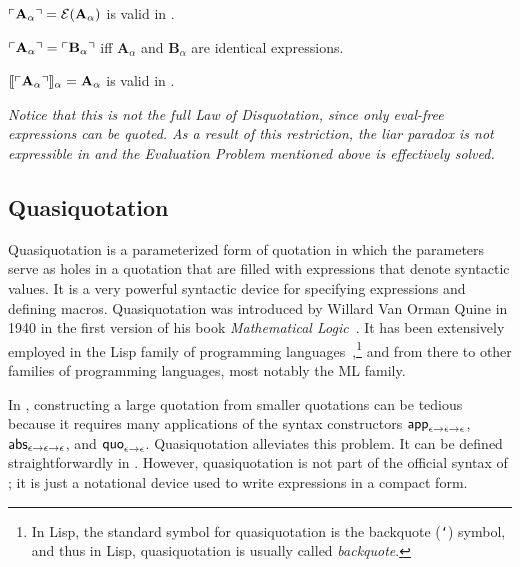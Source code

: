 \documentclass[fleqn]{llncs}
\begin{document}
\begin{thm} \label{thm:sem-quotation}
$\ulcorner\textbf{A}_\alpha\urcorner = \mbox{$\cal E$}(\textbf{A}_\alpha)$ is valid in
  {\churchqe}.
\end{thm}

\begin{cor}$\ulcorner\textbf{A}_\alpha\urcorner = \ulcorner\textbf{B}_\alpha\urcorner$ iff $\textbf{A}_\alpha$ and $\textbf{B}_\alpha$ are identical expressions.
\end{cor}

\begin{thm} \label{thm:sem-disquotation}
$\llbracket\ulcorner\textbf{A}_\alpha\urcorner\rrbracket_\alpha = \textbf{A}_\alpha$
  is valid in {\churchqe}.
\end{thm}

\begin{rem}\em
Notice that this is not the full Law of Disquotation, since only
eval-free expressions can be quoted.  As a result of this restriction,
the liar paradox is not expressible in {\churchqe} and the Evaluation
Problem mentioned above is effectively solved.
\end{rem}

\subsection{Quasiquotation}

Quasiquotation is a parameterized form of quotation in which the
parameters serve as holes in a quotation that are filled with
expressions that denote syntactic values.  It is a very powerful
syntactic device for specifying expressions and defining macros.
Quasiquotation was introduced by Willard Van Orman Quine in 1940 in
the first version of his book \emph{Mathematical
  Logic}~\cite{Quine03}.  It has been extensively employed in the Lisp
family of programming languages~\cite{Bawden99},\footnote{In Lisp, the
  standard symbol for quasiquotation is the backquote ({\tt `})
  symbol, and thus in Lisp, quasiquotation is usually called
  \emph{backquote}.} and from there to other families of
programming languages, most notably the ML family.

In {\churchqe}, constructing a large quotation from smaller quotations
can be tedious because it requires many applications of the syntax
constructors $\mbox{\sf app}_{\epsilon \rightarrow \epsilon \rightarrow
  \epsilon}$, $\mbox{\sf abs}_{\epsilon \rightarrow \epsilon \rightarrow
  \epsilon}$, and $\mbox{\sf quo}_{\epsilon \rightarrow \epsilon}$.
Quasiquotation alleviates this problem.
It can be defined straightforwardly in
{\churchqe}.  However, quasiquotation is not part of the official
syntax of {\churchqe}; it is just a notational device used to write
{\churchqe} expressions in a compact form.
\end{document}
